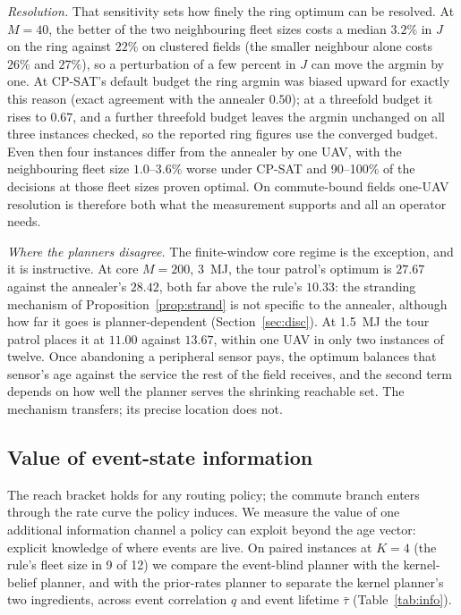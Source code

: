 \documentclass[journal,outdir=./]{IEEEtran}
\begin{document}
\textit{Resolution.} That sensitivity sets how finely the ring optimum can be resolved. At $M=40$, the better of the two neighbouring fleet sizes costs a median $3.2\%$ in $J$ on the ring against $22\%$ on clustered fields (the smaller neighbour alone costs $26\%$ and $27\%$), so a perturbation of a few percent in $J$ can move the argmin by one. At CP-SAT's default budget the ring argmin was biased upward for exactly this reason (exact agreement with the annealer $0.50$); at a threefold budget it rises to $0.67$, and a further threefold budget leaves the argmin unchanged on all three instances checked, so the reported ring figures use the converged budget. Even then four instances differ from the annealer by one UAV, with the neighbouring fleet size $1.0$--$3.6\%$ worse under CP-SAT and 90--100\% of the decisions at those fleet sizes proven optimal. On commute-bound fields one-UAV resolution is therefore both what the measurement supports and all an operator needs.

\textit{Where the planners disagree.} The finite-window core regime is the exception, and it is instructive. At core $M=200$, 3~MJ, the tour patrol's optimum is $27.67$ against the annealer's $28.42$, both far above the rule's $10.33$: the stranding mechanism of Proposition~\ref{prop:strand} is not specific to the annealer, although how far it goes is planner-dependent (Section~\ref{sec:disc}). At 1.5~MJ the tour patrol places it at $11.00$ against $13.67$, within one UAV in only two instances of twelve. Once abandoning a peripheral sensor pays, the optimum balances that sensor's age against the service the rest of the field receives, and the second term depends on how well the planner serves the shrinking reachable set. The mechanism transfers; its precise location does not.

\subsection{Value of event-state information}\label{sec:eval:info}
The reach bracket holds for any routing policy; the commute branch enters through the rate curve the policy induces. We measure the value of one additional information channel a policy can exploit beyond the age vector: explicit knowledge of where events are live. On paired instances at $K=4$ (the rule's fleet size in 9 of 12) we compare the event-blind planner with the kernel-belief planner, and with the prior-rates planner to separate the kernel planner's two ingredients, across event correlation $q$ and event lifetime $\bar\tau$ (Table~\ref{tab:info}).
\end{document}
